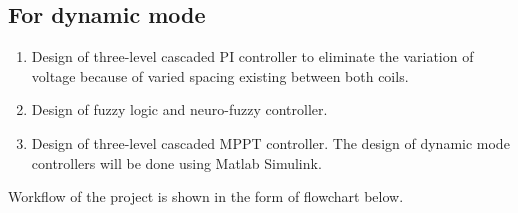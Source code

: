 \documentclass[12pt]{article}
\begin{document}
\subsection{For dynamic mode}
\begin{enumerate}
	\item Design of three-level cascaded PI controller  to eliminate the variation of voltage because of varied spacing existing between both coils.
	\item Design of fuzzy logic and neuro-fuzzy controller.
	\item Design of three-level cascaded MPPT controller. 
		The design of dynamic mode controllers will be done using Matlab Simulink. 
\end{enumerate}
Workflow of the project is shown in the form of flowchart below. 

\newpage
\end{document}
